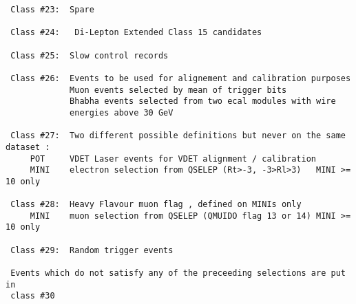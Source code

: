 \begin{verbatim}
 Class #23:  Spare
 
 Class #24:   Di-Lepton Extended Class 15 candidates
 
 Class #25:  Slow control records
 
 Class #26:  Events to be used for alignement and calibration purposes
             Muon events selected by mean of trigger bits
             Bhabha events selected from two ecal modules with wire
             energies above 30 GeV
 
 Class #27:  Two different possible definitions but never on the same dataset :
     POT     VDET Laser events for VDET alignment / calibration
     MINI    electron selection from QSELEP (Rt>-3, -3>Rl>3)   MINI >= 10 only
 
 Class #28:  Heavy Flavour muon flag , defined on MINIs only
     MINI    muon selection from QSELEP (QMUIDO flag 13 or 14) MINI >= 10 only
 
 Class #29:  Random trigger events
 
 Events which do not satisfy any of the preceeding selections are put in
 class #30
 
\end{verbatim}
